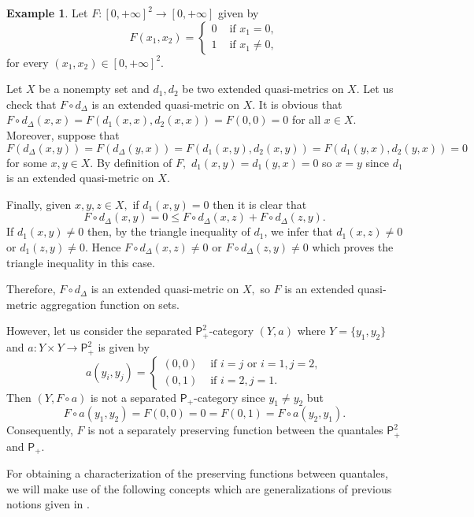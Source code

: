 \documentclass[11pt,a4paper]{amsart}
\theoremstyle{definition}
\newtheorem{example}[theorem]{Example}
\begin{document}
	\begin{example}\label{ex:sets_no_product}
		Let $F:[0,+\infty]^2\to [0,+\infty]$ given by
		$$F(x_1,x_2)=\begin{cases}
			0&\text{ if }x_1=0,\\
			1&\text{ if }x_1\neq 0,
		\end{cases}$$
		for every $(x_1,x_2)\in [0,+\infty]^2.$
		
		Let $X$ be a nonempty set and $d_1,d_2$ be two extended quasi-metrics on $X$. Let us check that $F\circ d_\Delta$ is an extended quasi-metric on $X.$ 
		It is obvious that $F\circ d_\Delta(x,x)=F(d_1(x,x),d_2(x,x))=F(0,0)=0$ for all $x\in X.$ Moreover, suppose that 
		$$F(d_\Delta(x,y))=F(d_\Delta(y,x))=F(d_1(x,y),d_2(x,y))=F(d_1(y,x),d_2(y,x))=0$$ for some $x,y\in X.$ By definition of $F,$ $d_1(x,y)=d_1(y,x)=0$ so $x=y$ since $d_1$ is an extended quasi-metric on $X.$ 
		
		Finally, given $x,y,z\in X,$ if $d_1(x,y)=0$ then it is clear that
		$$F\circ d_\Delta(x,y)=0\leq F\circ d_\Delta(x,z)+F\circ d_\Delta(z,y).$$
		If $d_1(x,y)\neq 0$ then, by the triangle inequality of $d_1$, we infer that $d_1(x,z)\neq 0$ or $d_1(z,y)\neq 0$. Hence $F\circ d_\Delta(x,z)\neq 0$ or $F\circ d_\Delta(z,y)\neq 0$ which proves the triangle inequality in this case.
		
		Therefore, $F\circ d_\Delta$ is an extended quasi-metric on $X,$ so $F$ is an extended quasi-metric aggregation function on sets.
		
		However, let us consider the separated $\mathsf{P}_+^2$-category $(Y,a)$ where $Y=\{y_1,y_2\}$ and $a:Y\times Y\to \mathsf{P}_+^2$ is given by
		$$a(y_i,y_j)=\begin{cases}
			(0,0)&\text{ if  }i= j \text{ or }i=1,j=2,\\
			(0,1)&\text{ if }i=2,j=1.
		\end{cases}$$
		Then $(Y,F\circ a)$ is not a separated $\mathsf{P}_+$-category since $y_1\neq y_2$ but
		$$F\circ a(y_1,y_2)=F(0,0)=0=F(0,1)=F\circ a(y_2,y_1).$$
		Consequently, $F$ is not a separately preserving function between the quantales $\mathsf{P}_+^2$ and $\mathsf{P}_+.$
		
	\end{example}
	
	
	
	For obtaining a characterization of the preserving functions between quantales, we will make use of the following concepts which are generalizations of previous notions given in \cite{Dobos98,MayorVale10,PRLVale21}.
	
\end{document}
